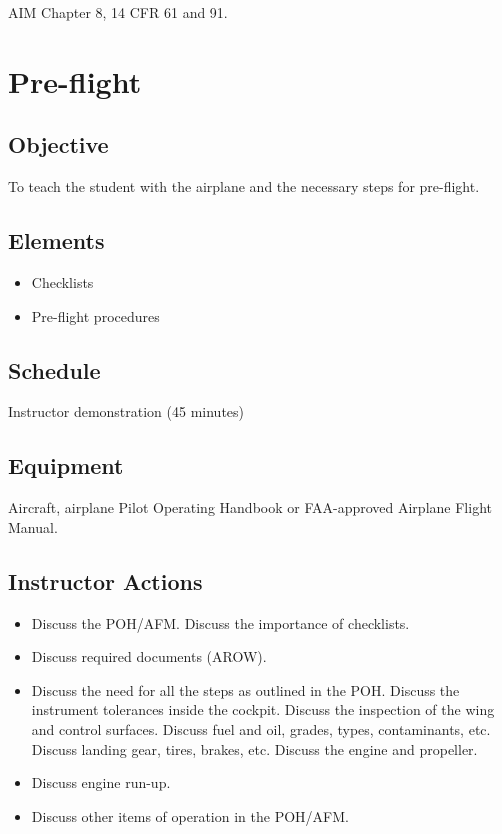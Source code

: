 \documentclass[twoside,openright]{report}
\begin{document}
AIM Chapter 8, 14 CFR 61 and 91.

\chapter{Pre-flight}

\section{Objective}

To teach the student with the airplane and the necessary steps for pre-flight.

\section{Elements}

\begin{itemize}
  \item Checklists
  \item Pre-flight procedures
\end{itemize}

\section{Schedule}

Instructor demonstration (45 minutes)

\section{Equipment}

Aircraft, airplane Pilot Operating Handbook or FAA-approved Airplane Flight
Manual.

\section{Instructor Actions}

\begin{itemize}
  \item Discuss the POH/AFM. Discuss the importance of checklists.

  \item Discuss required documents (AROW).

  \item Discuss the need for all the steps as outlined in the POH. Discuss the
    instrument tolerances inside the cockpit. Discuss the inspection of the
    wing and control surfaces. Discuss fuel and oil, grades, types,
    contaminants, etc. Discuss landing gear, tires, brakes, etc. Discuss the
    engine and propeller.

  \item Discuss engine run-up.

  \item Discuss other items of operation in the POH/AFM.
\end{itemize}
\end{document}
